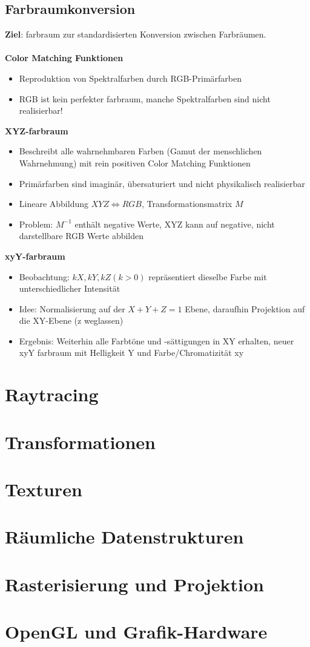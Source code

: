 \documentclass[10pt,a4paper]{article}
\begin{document}
	\subsection{Farbraumkonversion}
	\textbf{Ziel}: \Gls{farbraum} zur standardisierten Konversion zwischen Farbräumen.\\\\
	\textbf{Color Matching Funktionen}
		\begin{itemize}
			\item Reproduktion von Spektralfarben durch RGB-Primärfarben
			\item RGB ist kein perfekter \Gls{farbraum}, manche Spektralfarben sind nicht realisierbar!
		\end{itemize}		
	\textbf{XYZ-\Gls{farbraum}}
		\begin{itemize}
			\item Beschreibt alle wahrnehmbaren Farben (\glqq Gamut der menschlichen Wahrnehmung\grqq) mit rein positiven Color Matching Funktionen
			\item Primärfarben sind imaginär, übersaturiert und nicht physikalisch realisierbar
			\item Lineare Abbildung $XYZ \Leftrightarrow RGB$, Transformationsmatrix $M$
			\item Problem: $M^{-1}$ enthält negative Werte, XYZ kann auf negative, nicht darstellbare RGB Werte abbilden
		\end{itemize}
	\textbf{xyY-\Gls{farbraum}}
		\begin{itemize}
			\item Beobachtung: $kX, kY, kZ (k > 0)$ repräsentiert dieselbe Farbe mit unterschiedlicher Intensität
			\item Idee: Normalisierung auf der $X + Y + Z = 1$ Ebene, daraufhin Projektion auf die XY-Ebene (z weglassen)
			\item Ergebnis: Weiterhin alle Farbtöne und -sättigungen in XY erhalten, neuer xyY \Gls{farbraum} mit Helligkeit Y und Farbe/Chromatizität xy
		\end{itemize}

	\section{Raytracing}
	\section{Transformationen}
	\section{Texturen}
	\section{Räumliche Datenstrukturen}
	\section{Rasterisierung und Projektion}
	\section{OpenGL und Grafik-Hardware}

	\printnoidxglossary
\end{document}
